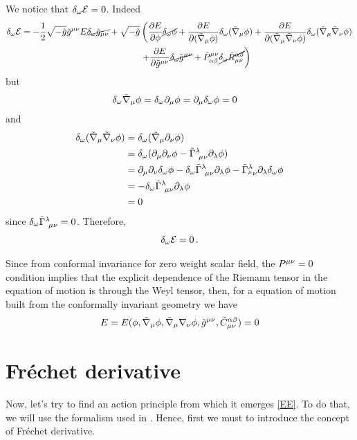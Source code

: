 We notice that $\delta_\omega\mathcal{E}=0$. Indeed
\begin{align*}
  \delta_\omega\mathcal{E}=-\frac{1}{2}\sqrt{-\tilde{g}}\tilde{g}^{\mu\nu }E\cancel{\delta_\omega\tilde{g}_{\mu\nu }}+\sqrt{-\tilde{g}}&\left(\pdv{E}{\phi}\cancel{\delta_\omega\phi} +\pdv{E}{(\tilde{\nabla}_\mu\phi)}\delta_\omega (\tilde{\nabla}_\mu\phi )+\pdv{E}{(\tilde{\nabla}_\mu\tilde{\nabla}_\nu\phi)}\delta_\omega(\tilde{\nabla}_\mu\tilde{\nabla}_\nu\phi )\right.\\&\left. +\pdv{E}{\tilde{g}^{\mu\nu}}\cancel{\delta_\omega\tilde{g}^{\mu\nu }}+\tilde{P}^{\mu\nu }_{\alpha\beta}\cancel{\delta_\omega\tilde{R}^{\alpha\beta }_{\mu\nu }}\right)
\end{align*}
but
\begin{align}
  \delta_\omega\tilde{\nabla}_\mu\phi&=\delta_\omega\partial_\mu\phi =\partial_\mu\delta_\omega\phi=0
\end{align}
and
\begin{align}
  \delta_\omega(\tilde{\nabla}_\mu\tilde{\nabla}_\nu\phi )&=\delta_\omega(\tilde{\nabla}_\mu\partial_\nu \phi )\\
 &=\delta_\omega(\partial_\mu\partial_\nu \phi -\tilde{\Gamma}^{\lambda}_{~\mu\nu }\partial_\lambda\phi )\\
 &=\partial_\mu\partial_\nu \delta_\omega\phi -\delta_\omega\tilde{\Gamma}^\lambda_{~\mu\nu }\partial_\lambda\phi -\tilde{\Gamma}^\lambda_{^\mu\nu }\partial_\lambda \delta_\omega\phi \\
 &=-\delta_\omega\tilde{\Gamma}^\lambda_{~\mu\nu }\partial_\lambda\phi\\
 &=0
\end{align}
since $\delta_\omega\tilde{\Gamma}^\lambda_{~\mu\nu }=0$. Therefore,
\begin{align}
  \delta_\omega\mathcal{E}=0\, .
\end{align}


Since from conformal invariance for zero weight scalar field, the $P^{\mu\nu }=0$ condition implies that the explicit dependence of the Riemann tensor in the equation of motion is through the Weyl tensor, then,  for a equation of motion built from the conformally invariant geometry we have
\begin{equation}\label{EE}
  E=E(\phi,\tilde{\nabla}_\mu\phi ,\tilde{\nabla}_\mu\nabla_\nu \phi ,\tilde{g}^{\mu\nu },\tilde{C}_{\mu\nu }^{\alpha\beta })=0
\end{equation}


\section{Fréchet derivative}
Now, let's try to find an action principle from which it emerges \eqref{EE}. To do that, we will use the formalism used in \cite{Ayon-Beato:2023bzp}. Hence, first we must to introduce the concept of Fréchet derivative.

